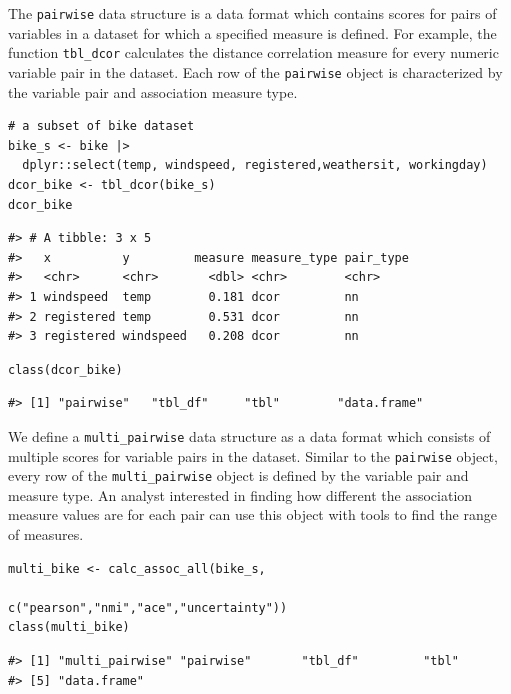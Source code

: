 The \texttt{pairwise} data structure is a data format which contains scores for pairs of variables in a dataset for which a specified measure is defined. For example, the function \texttt{tbl\_dcor} calculates the distance correlation measure for every numeric variable pair in the dataset. Each row of the \texttt{pairwise} object is characterized by the variable pair and association measure type.

\begin{verbatim}
# a subset of bike dataset
bike_s <- bike |> 
  dplyr::select(temp, windspeed, registered,weathersit, workingday)
dcor_bike <- tbl_dcor(bike_s)
dcor_bike
\end{verbatim}

\begin{verbatim}
#> # A tibble: 3 x 5
#>   x          y         measure measure_type pair_type
#>   <chr>      <chr>       <dbl> <chr>        <chr>    
#> 1 windspeed  temp        0.181 dcor         nn       
#> 2 registered temp        0.531 dcor         nn       
#> 3 registered windspeed   0.208 dcor         nn
\end{verbatim}

\begin{verbatim}
class(dcor_bike)
\end{verbatim}

\begin{verbatim}
#> [1] "pairwise"   "tbl_df"     "tbl"        "data.frame"
\end{verbatim}

We define a \texttt{multi\_pairwise} data structure as a data format which consists of multiple scores for variable pairs in the dataset. Similar to the \texttt{pairwise} object, every row of the \texttt{multi\_pairwise} object is defined by the variable pair and measure type. An analyst interested in finding how different the association measure values are for each pair can use this object with  tools to find the range of measures.

\begin{verbatim}
multi_bike <- calc_assoc_all(bike_s,
                                 c("pearson","nmi","ace","uncertainty"))
class(multi_bike)
\end{verbatim}

\begin{verbatim}
#> [1] "multi_pairwise" "pairwise"       "tbl_df"         "tbl"           
#> [5] "data.frame"
\end{verbatim}

